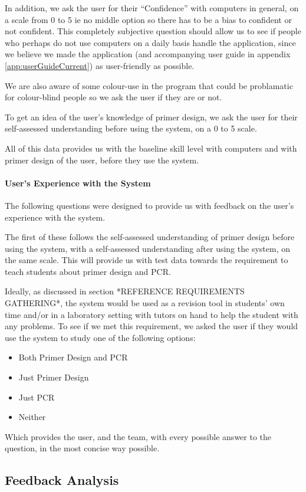In addition, we ask the user for their ``Confidence'' with computers
in general, on a scale from 0 to 5 ie no middle option so there has
to be a bias to confident or not confident.
This completely subjective question should allow us to see if people
who perhaps do not use computers on a daily basis handle the
application, since we believe we made the application (and
accompanying user guide in appendix \ref{app:userGuideCurrent}) as
user-friendly as possible.

We are also aware of some colour-use in the program that could be
problamatic for colour-blind people so we ask the user if they are or
not.

To get an idea of the user's knowledge of primer design, we ask the
user for their self-assessed understanding before using the system, on
a 0 to 5 scale.

All of this data provides us with the baseline skill level with
computers and with primer design of the user, before they use the
system.

\paragraph{User's Experience with the System}
The following questions were designed to provide us with feedback on
the user's experience with the system.

The first of these follows the self-assessed understanding of primer
design before using the system, with a self-assessed understanding
after using the system, on the same scale.
This will provide us with test data towards the requirement to teach
students about primer design and PCR.

Ideally, as discussed in section *REFERENCE REQUIREMENTS GATHERING*,
the system would be used as a revision tool in students' own time
and/or in a laboratory setting with tutors on hand to help the
student with any problems.
To see if we met this requirement, we asked the user if they would use
the system to study one of the following options:
\begin{itemize}
\item Both Primer Design and PCR
\item Just Primer Design
\item Just PCR
\item Neither
\end{itemize}
Which provides the user, and the team, with every possible answer to
the question, in the most concise way possible.


\subsection{Feedback Analysis}